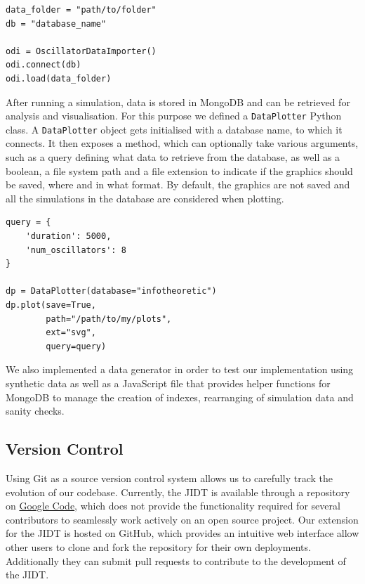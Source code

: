 \documentclass[a4paper,11pt]{article}
\begin{document}
\begin{verbatim}
data_folder = "path/to/folder"
db = "database_name"

odi = OscillatorDataImporter()
odi.connect(db)
odi.load(data_folder)
\end{verbatim}

After running a simulation, data is stored in MongoDB and can be retrieved for analysis and visualisation. For this purpose we defined a \texttt{DataPlotter} Python class. A \texttt{DataPlotter} object gets initialised with a database name, to which it connects. It then exposes a  method, which can optionally take various arguments, such as a query defining what data to retrieve from the database, as well as a boolean, a file system path and a file extension to indicate if the graphics should be saved, where and in what format. By default, the graphics are not saved and all the simulations in the database are considered when plotting.

\begin{verbatim}
query = {
	'duration': 5000,
	'num_oscillators': 8        
}

dp = DataPlotter(database="infotheoretic")
dp.plot(save=True,
        path="/path/to/my/plots",
        ext="svg",
        query=query)
\end{verbatim}


We also implemented a data generator in order to test our implementation using synthetic data as well as a JavaScript file that provides helper functions for MongoDB to manage the creation of indexes, rearranging of simulation data and sanity checks.

\subsection{Version Control}
Using Git as a source version control system allows us to carefully track the evolution of our codebase. Currently, the JIDT is available through a repository on \href{https://code.google.com/}{Google Code}, which does not provide the functionality required for several contributors to seamlessly work actively on an open source project. Our extension for the JIDT is hosted on GitHub, which provides an intuitive web interface allow other users to clone and fork the repository for their own deployments. Additionally they can submit pull requests to contribute to the development of the JIDT.

\clearpage
\end{document}
